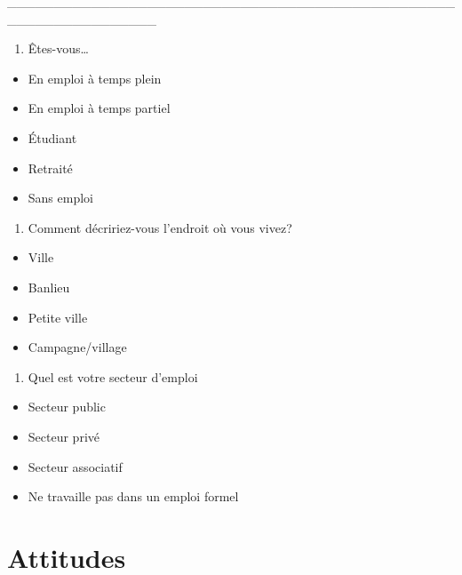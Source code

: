 \documentclass[
  letterpaper,
  DIV=11,
  numbers=noendperiod]{scrreprt}
\providecommand{\tightlist}{%
  \setlength{\itemsep}{0pt}\setlength{\parskip}{0pt}}\usepackage{longtable,booktabs,array}
\begin{document}
\_\_\_\_\_\_\_\_\_\_\_\_\_\_\_\_\_\_\_\_\_\_\_\_\_\_\_\_\_\_\_\_\_\_\_\_\_\_\_\_\_\_\_\_\_\_\_\_\_\_\_\_\_\_\_\_\_\_\_\_\_\_\_\_

\begin{enumerate}
\def\labelenumi{\arabic{enumi}.}
\setcounter{enumi}{12}
\tightlist
\item
  Êtes-vous\ldots{}
\end{enumerate}

\begin{itemize}
\tightlist
\item
  En emploi à temps plein
\item
  En emploi à temps partiel
\item
  Étudiant
\item
  Retraité
\item
  Sans emploi
\end{itemize}

\begin{enumerate}
\def\labelenumi{\arabic{enumi}.}
\setcounter{enumi}{13}
\tightlist
\item
  Comment décririez-vous l'endroit où vous vivez?
\end{enumerate}

\begin{itemize}
\tightlist
\item
  Ville
\item
  Banlieu
\item
  Petite ville
\item
  Campagne/village
\end{itemize}

\begin{enumerate}
\def\labelenumi{\arabic{enumi}.}
\setcounter{enumi}{14}
\tightlist
\item
  Quel est votre secteur d'emploi
\end{enumerate}

\begin{itemize}
\tightlist
\item
  Secteur public
\item
  Secteur privé
\item
  Secteur associatif
\item
  Ne travaille pas dans un emploi formel
\end{itemize}

\section{Attitudes}\label{attitudes}
\end{document}
